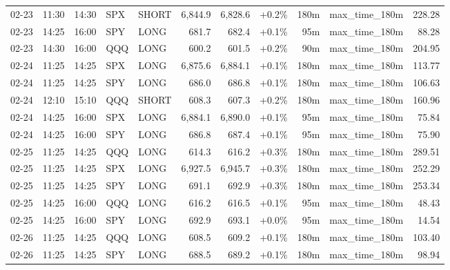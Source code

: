 \documentclass[11pt,a4paper,twoside]{article}
\begin{document}
\begin{center}
\begin{longtable}{>{\color{txtmain}}l l l l l r r r r >{\color{txtmain}}l r}
02-23 & 11:30 & 14:30 & SPX & SHORT & 6,844.9 & 6,828.6 & \textcolor{wingreen}{+0.2\%} & 180m & max\_time\_180m & \textcolor{wingreen}{228.28} \\
02-23 & 14:25 & 16:00 & SPY & LONG & 681.7 & 682.4 & \textcolor{wingreen}{+0.1\%} & 95m & max\_time\_180m & \textcolor{wingreen}{88.28} \\
02-23 & 14:30 & 16:00 & QQQ & LONG & 600.2 & 601.5 & \textcolor{wingreen}{+0.2\%} & 90m & max\_time\_180m & \textcolor{wingreen}{204.95} \\
02-24 & 11:25 & 14:25 & SPX & LONG & 6,875.6 & 6,884.1 & \textcolor{wingreen}{+0.1\%} & 180m & max\_time\_180m & \textcolor{wingreen}{113.77} \\
02-24 & 11:25 & 14:25 & SPY & LONG & 686.0 & 686.8 & \textcolor{wingreen}{+0.1\%} & 180m & max\_time\_180m & \textcolor{wingreen}{106.63} \\
02-24 & 12:10 & 15:10 & QQQ & SHORT & 608.3 & 607.3 & \textcolor{wingreen}{+0.2\%} & 180m & max\_time\_180m & \textcolor{wingreen}{160.96} \\
02-24 & 14:25 & 16:00 & SPX & LONG & 6,884.1 & 6,890.0 & \textcolor{wingreen}{+0.1\%} & 95m & max\_time\_180m & \textcolor{wingreen}{75.84} \\
02-24 & 14:25 & 16:00 & SPY & LONG & 686.8 & 687.4 & \textcolor{wingreen}{+0.1\%} & 95m & max\_time\_180m & \textcolor{wingreen}{75.90} \\
02-25 & 11:25 & 14:25 & QQQ & LONG & 614.3 & 616.2 & \textcolor{wingreen}{+0.3\%} & 180m & max\_time\_180m & \textcolor{wingreen}{289.51} \\
02-25 & 11:25 & 14:25 & SPX & LONG & 6,927.5 & 6,945.7 & \textcolor{wingreen}{+0.3\%} & 180m & max\_time\_180m & \textcolor{wingreen}{252.29} \\
02-25 & 11:25 & 14:25 & SPY & LONG & 691.1 & 692.9 & \textcolor{wingreen}{+0.3\%} & 180m & max\_time\_180m & \textcolor{wingreen}{253.34} \\
02-25 & 14:25 & 16:00 & QQQ & LONG & 616.2 & 616.5 & \textcolor{wingreen}{+0.1\%} & 95m & max\_time\_180m & \textcolor{wingreen}{48.43} \\
02-25 & 14:25 & 16:00 & SPY & LONG & 692.9 & 693.1 & \textcolor{wingreen}{+0.0\%} & 95m & max\_time\_180m & \textcolor{wingreen}{14.54} \\
02-26 & 11:25 & 14:25 & QQQ & LONG & 608.5 & 609.2 & \textcolor{wingreen}{+0.1\%} & 180m & max\_time\_180m & \textcolor{wingreen}{103.40} \\
02-26 & 11:25 & 14:25 & SPY & LONG & 688.5 & 689.2 & \textcolor{wingreen}{+0.1\%} & 180m & max\_time\_180m & \textcolor{wingreen}{98.94} \\

\end{longtable}
\end{center}
\end{document}
